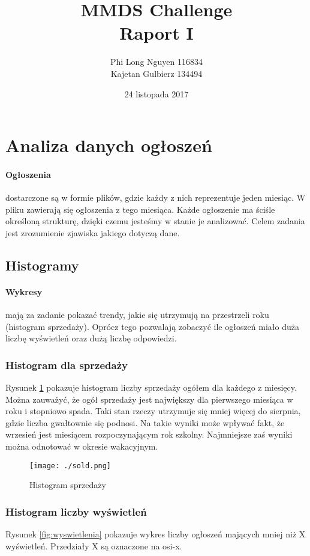 \documentclass[a4paper,11pt]{article}
\author{Phi Long Nguyen 116834 \\ Kajetan Gulbierz 134494}
\title{MMDS Challenge\\
\large{{\bf Raport I}  }}
\date{24 listopada  2017}
\begin{document}
\maketitle 

\section{{Analiza danych ogłoszeń}}
\paragraph{Ogłoszenia} dostarczone są w formie plików, gdzie każdy z nich reprezentuje jeden miesiąc. W pliku zawierają się ogłoszenia z tego miesiąca. Każde ogłoszenie ma ściśle określoną strukturę, dzięki czemu jesteśmy w stanie je analizować. Celem zadania jest zrozumienie zjawiska jakiego dotyczą dane. 

\subsection{Histogramy}
\paragraph{Wykresy} mają za zadanie pokazać trendy, jakie się utrzymują na przestrzeli roku (histogram sprzedaży). Oprócz tego pozwalają zobaczyć ile ogłoszeń miało duża liczbę wyświetleń oraz dużą liczbę odpowiedzi.\


\subsubsection{Histogram dla sprzedaży} 
Rysunek \ref{fig:automat} pokazuje histogram liczby sprzedaży ogółem dla każdego z miesięcy. Można zauważyć, że ogół sprzedaży jest największy dla pierwszego miesiąca w roku i stopniowo spada. Taki stan rzeczy utrzymuje się mniej więcej do sierpnia, gdzie liczba gwałtownie się podnosi. Na takie wyniki może wpływać fakt, że wrzesień jest miesiącem rozpoczynającym rok szkolny. Najmniejsze zaś wyniki można odnotować w okresie wakacyjnym.  

\begin{figure}[H]
	\centering
	\texttt{[image: ./sold.png]}
	\caption{\label{fig:automat}Histogram sprzedaży}
\end{figure}

\subsubsection{Histogram liczby wyświetleń} 
Rysunek \ref{fig:wyswietlenia} pokazuje wykres liczby ogłoszeń mających mniej niż X wyświetleń. Przedziały X są oznaczone na osi-x.
\end{document}
